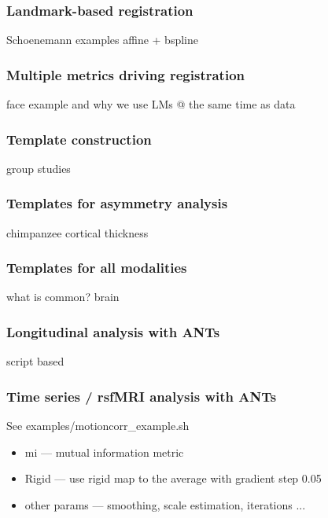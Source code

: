 \documentclass[18pt]{beamer}
\begin{document}
\begin{frame}
\frametitle{Landmark-based registration}
Schoenemann examples affine + bspline 
\end{frame}

\begin{frame}
\frametitle{Multiple metrics driving registration}
face example and why we use LMs @ the same time as data 
\end{frame}

\begin{frame}
\frametitle{Template construction}
group studies 
\end{frame}

\begin{frame}
\frametitle{Templates for asymmetry analysis}
chimpanzee cortical thickness 
\end{frame}

\begin{frame}
\frametitle{Templates for all modalities}
what is common?  brain
\end{frame}

\begin{frame}
\frametitle{Longitudinal analysis with ANTs}
script based 
\end{frame} 

\begin{frame}
\frametitle{Time series / rsfMRI analysis with ANTs}
See  examples/motioncorr\_example.sh

\begin{itemize}
\item mi --- mutual information metric 
\pause
\item Rigid --- use rigid map to the average with gradient step 0.05
\pause
\item other params --- smoothing, scale estimation, iterations ... 
\end{itemize}
\end{frame}
\end{document}
